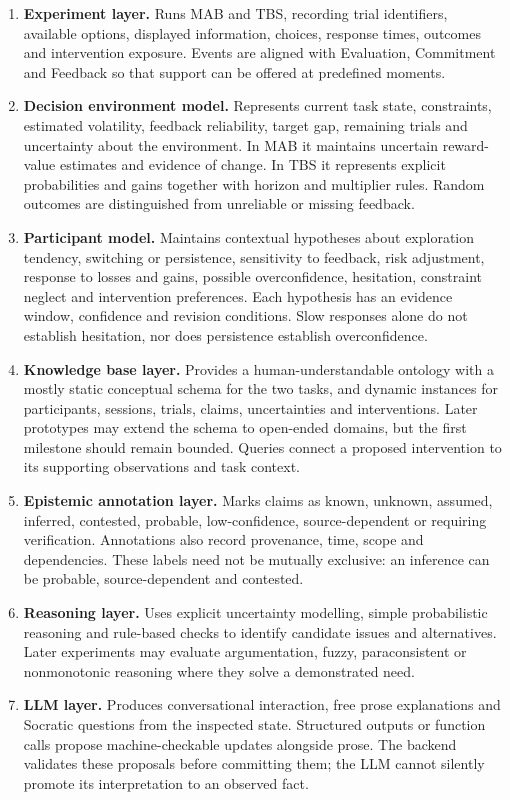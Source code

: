 \documentclass[11pt,a4paper]{article}
\begin{document}
\begin{enumerate}
\item \textbf{Experiment layer.} Runs MAB and TBS, recording trial identifiers, available options, displayed information, choices, response times, outcomes and intervention exposure. Events are aligned with Evaluation, Commitment and Feedback so that support can be offered at predefined moments.
\item \textbf{Decision environment model.} Represents current task state, constraints, estimated volatility, feedback reliability, target gap, remaining trials and uncertainty about the environment. In MAB it maintains uncertain reward-value estimates and evidence of change. In TBS it represents explicit probabilities and gains together with horizon and multiplier rules. Random outcomes are distinguished from unreliable or missing feedback.
\item \textbf{Participant model.} Maintains contextual hypotheses about exploration tendency, switching or persistence, sensitivity to feedback, risk adjustment, response to losses and gains, possible overconfidence, hesitation, constraint neglect and intervention preferences. Each hypothesis has an evidence window, confidence and revision conditions. Slow responses alone do not establish hesitation, nor does persistence establish overconfidence.
\item \textbf{Knowledge base layer.} Provides a human-understandable ontology with a mostly static conceptual schema for the two tasks, and dynamic instances for participants, sessions, trials, claims, uncertainties and interventions. Later prototypes may extend the schema to open-ended domains, but the first milestone should remain bounded.
Queries connect a proposed intervention to its supporting observations and task context.
\item \textbf{Epistemic annotation layer.} Marks claims as known, unknown, assumed, inferred, contested, probable, low-confidence, source-dependent or requiring verification. Annotations also record provenance, time, scope and dependencies. These labels need not be mutually exclusive: an inference can be probable, source-dependent and contested.
\item \textbf{Reasoning layer.} Uses explicit uncertainty modelling, simple probabilistic reasoning and rule-based checks to identify candidate issues and alternatives. Later experiments may evaluate argumentation, fuzzy, paraconsistent or nonmonotonic reasoning where they solve a demonstrated need.
\item \textbf{LLM layer.} Produces conversational interaction, free prose explanations and Socratic questions from the inspected state. Structured outputs or function calls propose machine-checkable updates alongside prose. The backend validates these proposals before committing them; the LLM cannot silently promote its interpretation to an observed fact.

\end{enumerate}
\end{document}
